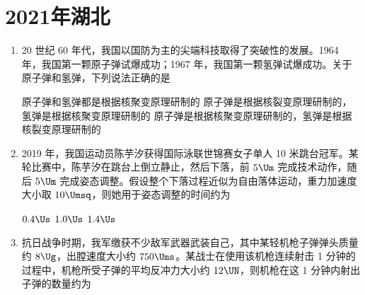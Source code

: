 \documentclass[\gkver]{gaokaozhenti}
\begin{document}
\chapter{2021年湖北}

\begin{enumerate}
\item
20 世纪 60 年代，我国以国防为主的尖端科技取得了突破性的发展。1964 年，我国第一颗原子弹试爆成功；1967 年，我国第一颗氢弹试爆成功。关于原子弹和氢弹，下列说法正确的是 

{原子弹和氢弹都是根据核聚变原理研制的}
{原子弹是根据核裂变原理研制的，氢弹是根据核聚变原理研制的}
{原子弹是根据核聚变原理研制的，氢弹是根据核裂变原理研制的}


\item
2019 年，我国运动员陈芋汐获得国际泳联世锦赛女子单人 10 米跳台冠军。某轮比赛中，陈芋汐在跳台上倒立静止，然后下落，前 $5 \Um$ 完成技术动作，随后 $5 \Um$ 完成姿态调整。假设整个下落过程近似为自由落体运动，重力加速度大小取 $10 \Umsq$，则她用于姿态调整的时间约为 

\fourchoices[answer=B]
{$0.2 \Us$}
{$0.4 \Us$}
{$1.0 \Us$}
{$1.4 \Us$}


\item
抗日战争时期，我军缴获不少敌军武器武装自己，其中某轻机枪子弹弹头质量约 $8 \Ug$，出膛速度大小约 $750 \Ums$。某战士在使用该机枪连续射击 1 分钟的过程中，机枪所受子弹的平均反冲力大小约 $12 \UN$，则机枪在这 1 分钟内射出子弹的数量约为 


\end{enumerate}
\end{document}
